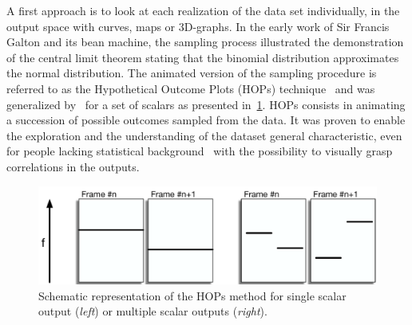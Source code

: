 A first approach is to look at each realization of the data set individually, in the output space with curves, maps or 3D-graphs. In the early work of Sir Francis Galton and its bean machine, the sampling process illustrated the demonstration of the central limit theorem stating that the binomial distribution approximates the normal distribution. The animated version of the sampling procedure is referred to as the Hypothetical Outcome Plots (HOPs) technique~\citep{Ehlschlaeger1997} and was generalized by~\citep{Hullman2015} for a set of scalars as presented in~\cref{fig:pattern_hop}. HOPs consists in animating a succession of possible outcomes sampled from the data. It was proven to enable the exploration and the understanding of the dataset general characteristic, even for people lacking statistical background~\citep{Belia2005} with the possibility to visually grasp correlations in the outputs. 

\begin{figure}[!h]
\centering
\includegraphics[width=0.8\linewidth,keepaspectratio]{fig/literature/pattern_hop.pdf}
\caption{Schematic representation of the HOPs method for single scalar output (\emph{left}) or multiple scalar outputs (\emph{right}).}
\label{fig:pattern_hop}
\end{figure}

